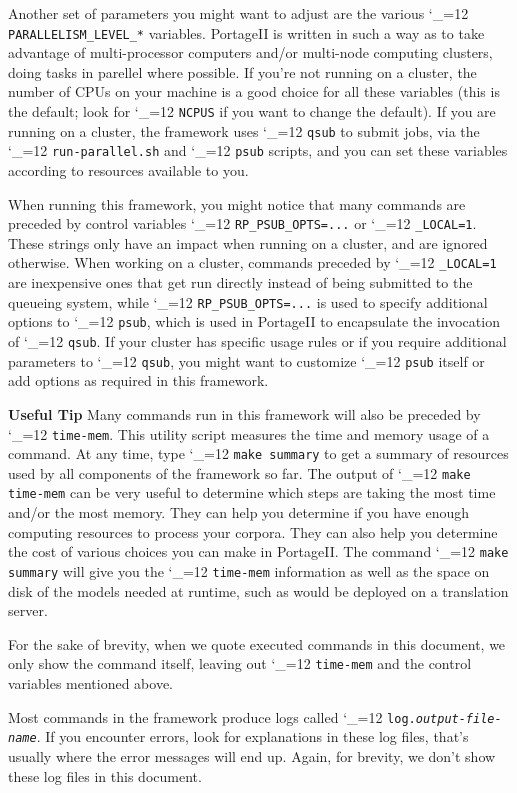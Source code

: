 \documentclass[11pt,letterpaper]{article}
\newcommand{\PS}{PortageII\xspace}
\def\code{\begingroup\catcode`\_=12 \codex}
\newcommand{\codex}[1]{\texttt{#1}\endgroup}
\newcommand{\tip}{\textbf{Useful Tip \large{\ding{43}} }}
\newcommand{\margintip}{\marginpar[{\textbf{Tip \large{\ding{43}}}}]{\textbf{\reflectbox{\large{\ding{43}}} Tip}}}
\newcommand{\tipend}{\textbf{ \reflectbox{\large{\ding{43}}}}}
\begin{document}
Another set of parameters you might want to adjust are the various
\code{PARALLELISM_LEVEL_*} variables.  \PS is written in such a way as to take
advantage of multi-processor computers and/or multi-node computing clusters,
doing tasks in parellel where possible.  If you're not running on a cluster,
the number of CPUs on your machine is a good choice for all these variables
(this is the default; look for \code{NCPUS} if you want to change the default).
If you are running on a cluster, the framework uses
\code{qsub} to submit jobs, via the \code{run-parallel.sh} and \code{psub}
scripts, and you can set these variables according to resources available to
you.

When running this framework, you might notice that many commands are preceded
by control variables \code{RP_PSUB_OPTS=...} or \code{_LOCAL=1}.  These strings
only have an impact when running on a cluster, and are ignored otherwise.  When
working on a cluster, commands preceded by \code{_LOCAL=1} are inexpensive ones
that get run directly instead of being submitted to the queueing system, while
\code{RP_PSUB_OPTS=...} is used to specify additional options to \code{psub},
which is used in \PS to encapsulate the invocation of \code{qsub}.  If your
cluster has specific usage rules or if you require additional parameters to
\code{qsub}, you might want to customize \code{psub} itself or add options as
required in this framework.

\tip\margintip Many commands run in this framework will also be preceded by
\code{time-mem}. This utility script measures the time and memory usage of a
command.  At any time, type \code{make summary} to get a summary of resources
used by all components of the framework so far.  The output of \code{make
time-mem} can be very useful to determine which steps are taking the most time
and/or the most memory.  They can help you determine if you have enough
computing resources to process your corpora.  They can also help you determine
the cost of various choices you can make in \PS.  The command \code{make
summary} will give you the \code{time-mem} information as well as the space on
disk of the models needed at runtime, such as would be deployed on a
translation server.\tipend

For the sake of brevity, when we quote executed commands in this document, we
only show the command itself, leaving out \code{time-mem} and the control
variables mentioned above.

Most commands in the framework produce logs called
\code{log.\emph{output-file-name}}.  If you encounter errors, look for
explanations in these log files, that's usually where the error messages will
end up.  Again, for brevity, we don't show these log files in this document.
\end{document}
